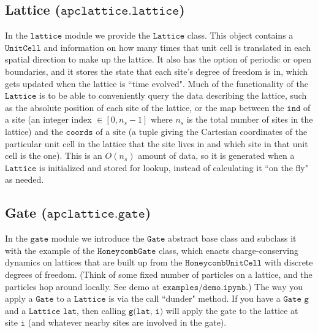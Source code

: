 \documentclass{article}
\begin{document}
\subsection{Lattice ($\texttt{apclattice.lattice}$)}
In the $\texttt{lattice}$ module we provide the $\texttt{Lattice}$ class. This object contains a $\texttt{UnitCell}$ and information on how many times that unit cell is translated in each spatial direction to make up the lattice. It also has the option of periodic or open boundaries, and it stores the state that each site's degree of freedom is in, which gets updated when the lattice is ``time evolved". Much of the functionality of the $\texttt{Lattice}$ is to be able to conveniently query the data describing the lattice, such as the absolute position of each site of the lattice, or the map between the $\texttt{ind}$ of a site (an integer index $\in [0, n_s-1]$ where $n_s$ is the total number of sites in the lattice) and the $\texttt{coords}$ of a site (a tuple giving the Cartesian coordinates of the particular unit cell in the lattice that the site lives in and which site in that unit cell is the one). This is an $O(n_s)$ amount of data, so it is generated when a $\texttt{Lattice}$ is initialized and stored for lookup, instead of calculating it ``on the fly" as needed.

\subsection{Gate ($\texttt{apclattice.gate}$)}
In the $\texttt{gate}$ module we introduce the $\texttt{Gate}$ abstract base class and subclass it with the example of the $\texttt{HoneycombGate}$ class, which enacts charge-conserving dynamics on lattices that are built up from the $\texttt{HoneycombUnitCell}$ with discrete degrees of freedom. (Think of some fixed number of particles on a lattice, and the particles hop around locally. See demo at $\texttt{examples/demo.ipynb}$.) The way you apply a $\texttt{Gate}$ to a $\texttt{Lattice}$ is via the call ``dunder" method. If you have a $\texttt{Gate}$ $\texttt{g}$ and a $\texttt{Lattice}$ $\texttt{lat}$, then calling $\texttt{g(lat, i)}$ will apply the gate to the lattice at site $\texttt{i}$ (and whatever nearby sites are involved in the gate).
\end{document}

